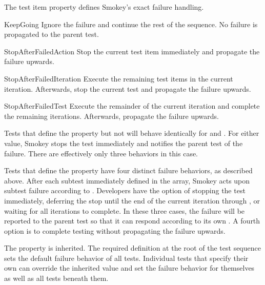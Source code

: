 The test item property  defines Smokey's exact failure
handling.

\begin{Definition}

	\item[KeepGoing] Ignore the failure and continue the rest of the
	sequence.  No failure is propagated to the parent test.

	\item[StopAfterFailedAction] Stop the current test item immediately and
	propagate the failure upwards.

	\item[StopAfterFailedIteration] Execute the remaining test items in the
	current iteration.  Afterwards, stop the current test and propagate the
	failure upwards.

	\item[StopAfterFailedTest] Execute the remainder of the current
	iteration and complete the remaining iterations.  Afterwards, propagate
	the failure upwards.

\end{Definition}

Tests that define the  property but not  will
behave identically for  and
.  For either value, Smokey stops the test
immediately and notifies the parent test of the failure.  There are effectively
only three behaviors in this case.

Tests that define the  property have four distinct failure
behaviors, as described above.  After each subtest immediately defined in the
 array, Smokey acts upon subtest failure according to
.  Developers have the option of stopping the test
immediately, deferring the stop until the end of the current iteration through
, or waiting for all iterations to complete.  In these three cases,
the failure will be reported to the parent test so that it can respond
according to its own .  A fourth option is to complete
testing without propagating the failure upwards.

The  property is inherited.  The required definition at
the root of the test sequence sets the default failure behavior of all tests.
Individual tests that specify their own  can override the
inherited value and set the failure behavior for themselves as well as all
tests beneath them.

